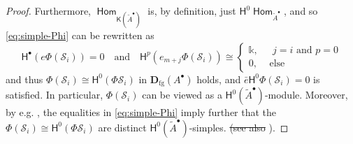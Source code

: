 \documentclass[a4paper,11pt, reqno]{amsart}
\def\DD{\mathbf D}
\def\sS{\mathscr{S}}
\newcommand{\opname}[1]{\operatorname{\mathsf{#1}}}
\newcommand{\Hom}{\opname{Hom}}
\newcommand{\bH}{\mathsf{H}}
\newcommand{\bK}{\mathsf{K}}
\theoremstyle{plain}
\theoremstyle{definition}
\numberwithin{equation}{section}
\begin{document}
\begin{proof}
 Furthermore, $\Hom_{\bK (\tilde{A}^\bullet )}$ is, by definition, just $\bH^0 \Hom_{\tilde{A}^\bullet}$, and so \eqref{eq:simple-Phi} can be rewritten as
 \begin{equation}\label{eq:simple-cohom}
     \bH^\bullet ( e \Phi (\sS_i )  ) = 0 \quad \text{and} \quad 
         \bH^{p } (  e_{m+j} \Phi ( \sS_i )  ) \cong 
        \begin{cases}
\mathbb k, &\text{ $j= i$ and $p=0$}\\
0 , &\text{ else}
\end{cases}
 \end{equation}
 and thus  $\Phi( \sS_i ) \cong \bH^0 ( \Phi \sS_i )$ in $\DD_{\mathrm{fg}} ( A^\bullet  )$ holds, and $\bar{e} \bH^0 \Phi ( \sS_i )  = 0$ is satisfied.
 In particular, $\Phi( \sS_i ) $ can be viewed as a $\bH^0 ( \tilde{A}^\bullet )$-module. 
 Moreover, by e.g. \cite[Section 4.4]{koenig-yang}, the equalities in \eqref{eq:simple-Phi} imply further that the $\Phi( \sS_i ) \cong \bH^0 ( \Phi \sS_i )$ are distinct $\bH^0 ( \tilde{A}^\bullet )$-simples.
 \sout{(see also} \cite[Section 4.4]{koenig-yang}).


\end{proof}
\end{document}
